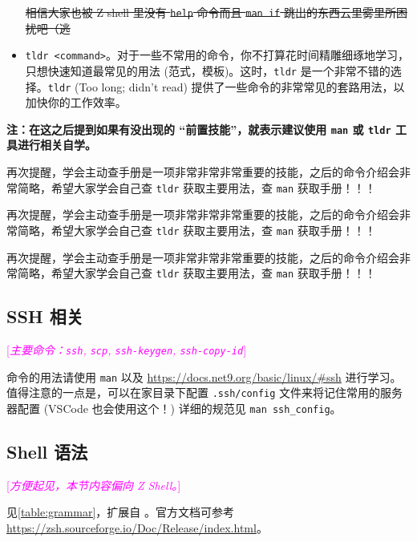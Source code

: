 \documentclass{article}
\begin{document}
\begin{itemize}
			\normalcolor\sout{相信大家也被 Z shell 里没有 \texttt{help} 命令而且 \texttt{man if} 跳出的东西云里雾里所困扰吧（逃}
		\item \texttt{tldr <command>}。对于一些不常用的命令，你不打算花时间精雕细琢地学习，只想快速知道最常见的用法 (范式，模板)。这时，\texttt{tldr} 是一个非常不错的选择。\texttt{tldr} (Too long; didn't read) 提供了一些命令的非常常见的套路用法，以加快你的工作效率。
	\end{itemize}

	{\color{red}\bfseries 注：在这之后提到如果有没出现的 ``前置技能''，就表示建议使用 \texttt{man} 或 \texttt{tldr} 工具进行相关自学。\par
	再次提醒，学会主动查手册是一项非常非常非常重要的技能，之后的命令介绍会非常简略，希望大家学会自己查 \texttt{tldr} 获取主要用法，查 \texttt{man} 获取手册！！！\par
	再次提醒，学会主动查手册是一项非常非常非常重要的技能，之后的命令介绍会非常简略，希望大家学会自己查 \texttt{tldr} 获取主要用法，查 \texttt{man} 获取手册！！！\par
	再次提醒，学会主动查手册是一项非常非常非常重要的技能，之后的命令介绍会非常简略，希望大家学会自己查 \texttt{tldr} 获取主要用法，查 \texttt{man} 获取手册！！！}

	\subsection{SSH 相关}

	\textcolor{fuchsia}{[\textit{主要命令：\texttt{ssh}, \texttt{scp}, \texttt{ssh-keygen}, \texttt{ssh-copy-id}}]}

	命令的用法请使用 \texttt{man} 以及 \url{https://docs.net9.org/basic/linux/#ssh} 进行学习。值得注意的一点是，可以在家目录下配置 \texttt{.ssh/config} 文件来将记住常用的服务器配置 (VSCode 也会使用这个！) 详细的规范见 \verb!man ssh_config!。

	\subsection{Shell 语法}

	\textcolor{fuchsia}{[\textit{方便起见，本节内容偏向 Z Shell。}]}

	见\autoref{table:grammar}，扩展自 \cite{lbwvssl}。官方文档可参考 \url{https://zsh.sourceforge.io/Doc/Release/index.html}。
\end{document}
